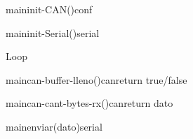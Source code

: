 
\begin {sequencediagram}

 


\begin{call}{main}{init-CAN()}{conf}{}
\end{call}
\begin{call}{main}{init-Serial()}{serial}{}
\end{call}


\begin{sdblock}[blue!10]{Loop}{}
	

	\begin{call}[2]{main}{can-buffer-lleno()}{can}{return true/false}
	\end{call}

	\begin{call}[2]{main}{can-cant-bytes-rx()}{can}{return dato}
	\end{call}
    
    \begin{call}[2]{main}{enviar(dato)}{serial}{}
	\end{call}
    
    
	\end{sdblock}
\end {sequencediagram}